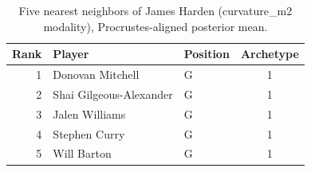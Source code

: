 \begin{table}[htbp]
  \centering\small
  \begin{tabular}{rllc}
    \toprule
    Rank & Player & Position & Archetype \\
    \midrule
    1 & Donovan Mitchell & G & 1 \\
    2 & Shai Gilgeous-Alexander & G & 1 \\
    3 & Jalen Williams & G & 1 \\
    4 & Stephen Curry & G & 1 \\
    5 & Will Barton & G & 1 \\
    \bottomrule
  \end{tabular}
  \caption{Five nearest neighbors of James Harden (curvature_m2 modality), Procrustes-aligned posterior mean.}
  \label{tab:James_Harden_neighbors_curvature_m2}
\end{table}

